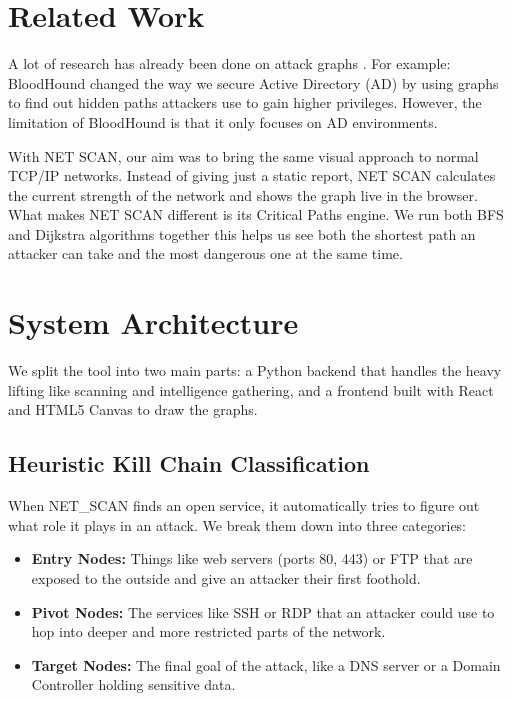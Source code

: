 \documentclass[conference]{IEEEtran}
\begin{document}
\section{Related Work}
A lot of research has already been done on attack graphs \cite{ammann2002}. For example: BloodHound \cite{bloodhound} changed the way we secure Active Directory (AD) by using graphs to find out hidden paths attackers use to gain higher privileges. However, the limitation of BloodHound is that it only focuses on AD environments.

With NET SCAN, our aim was to bring the same visual approach to normal TCP/IP networks. Instead of giving just a static report, NET SCAN calculates the current strength of the network and shows the graph live in the browser. What makes NET SCAN different is its Critical Paths engine. We run both BFS and Dijkstra algorithms together this helps us see both the shortest path an attacker can take and the most dangerous one at the same time.

\section{System Architecture}
We split the tool into two main parts: a Python backend that handles the heavy lifting like scanning and intelligence gathering, and a frontend built with React and HTML5 Canvas to draw the graphs.

\subsection{Heuristic Kill Chain Classification}
When NET\_SCAN finds an open service, it automatically tries to figure out what role it plays in an attack. We break them down into three categories:
\begin{itemize}
    \item \textbf{Entry Nodes:} Things like web servers (ports 80, 443) or FTP that are exposed to the outside and give an attacker their first foothold.
    \item \textbf{Pivot Nodes:} The services like SSH or RDP that an attacker could use to hop into deeper and more restricted parts of the network.
    \item \textbf{Target Nodes:} The final goal of the attack, like a DNS server or a Domain Controller holding sensitive data.
\end{itemize}
\end{document}
